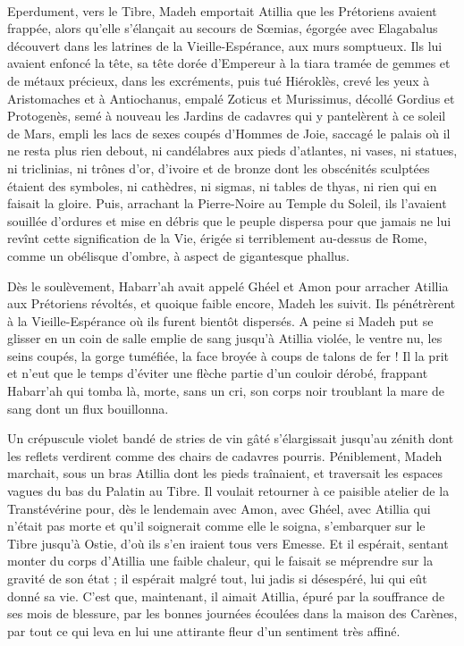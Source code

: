 \documentclass[a4paper, 11pt, oneside, polutonikogreek, french]{article}
\begin{document}
\paragraph{}
Eperdument, vers le Tibre, Madeh emportait Atillia que les Prétoriens avaient frappée, alors qu'elle s'élançait au secours de Sœmias, égorgée avec Elagabalus découvert dans les latrines de la Vieille-Espérance, aux murs somptueux. Ils lui avaient enfoncé la tête, sa tête dorée d'Empereur à la tiara tramée de gemmes et de métaux précieux, dans les excréments, puis tué Hiéroklès, crevé les yeux à Aristomaches et à Antiochanus, empalé Zoticus et Murissimus, décollé Gordius et Protogenès, semé à nouveau les Jardins de cadavres qui y pantelèrent à ce soleil de Mars, empli les lacs de sexes coupés d'Hommes de Joie, saccagé le palais où il ne resta plus rien debout, ni candélabres aux pieds d'atlantes, ni vases, ni statues, ni triclinias, ni trônes d'or, d'ivoire et de bronze dont les obscénités sculptées étaient des symboles, ni cathèdres, ni sigmas, ni tables de thyas, ni rien qui en faisait la gloire. Puis, arrachant la Pierre-Noire au Temple du Soleil, ils l'avaient souillée d'ordures et mise en débris que le peuple dispersa pour que jamais ne lui revînt cette signification de la Vie, érigée si terriblement au-dessus de Rome, comme un obélisque d'ombre, à aspect de gigantesque phallus.

Dès le soulèvement, Habarr'ah avait appelé Ghéel et Amon pour arracher Atillia aux Prétoriens révoltés, et quoique faible encore, Madeh les suivit. Ils pénétrèrent à la Vieille-Espérance où ils furent bientôt dispersés. A peine si Madeh put se glisser en un coin de salle emplie de sang jusqu'à Atillia violée, le ventre nu, les seins coupés, la gorge tuméfiée, la face broyée à coups de talons de fer ! Il la prit et n'eut que le temps d'éviter une flèche partie d'un couloir dérobé, frappant Habarr'ah qui tomba là, morte, sans un cri, son corps noir troublant la mare de sang dont un flux bouillonna.

Un crépuscule violet bandé de stries de vin gâté s'élargissait jusqu'au zénith dont les reflets verdirent comme des chairs de cadavres pourris. Péniblement, Madeh marchait, sous un bras Atillia dont les pieds traînaient, et traversait les espaces vagues du bas du Palatin au Tibre. Il voulait retourner à ce paisible atelier de la Transtévérine pour, dès le lendemain avec Amon, avec Ghéel, avec Atillia qui n'était pas morte et qu'il soignerait comme elle le soigna, s'embarquer sur le Tibre jusqu'à Ostie, d'où ils s'en iraient tous vers Emesse. Et il espérait, sentant monter du corps d'Atillia une faible chaleur, qui le faisait se méprendre sur la gravité de son état ; il espérait malgré tout, lui jadis si désespéré, lui qui eût donné sa vie. C'est que, maintenant, il aimait Atillia, épuré par la souffrance de ses mois de blessure, par les bonnes journées écoulées dans la maison des Carènes, par tout ce qui leva en lui une attirante fleur d'un sentiment très affiné.
\end{document}
